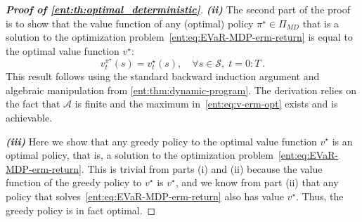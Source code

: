 \documentclass[twoside]{article}
\newcommand{\states}{\mathcal{S}}
\newcommand{\actions}{\mathcal{A}}
\newcommand{\opt}{^\star}
\newcommand{\erm}[2]{\operatorname{ERM}_{#1}\left[#2\right]}
\theoremstyle{plain}
\theoremstyle{definition}
\theoremstyle{remark}
\begin{document}
\begin{proof}[\bf\em Proof of \cref{ent:th:optimal_deterministic}]


{\bf\em (ii)} The second part of the proof is to show that the value function of any (optimal) policy $\pi\opt\in\Pi_{MD}$ that is a solution to the optimization problem~\eqref{ent:eq:EVaR-MDP-erm-return} is equal to the optimal value function $v\opt$:
\[
v_t^{\pi\opt}(s) = v_t\opt(s), \quad \forall s\in \states, \; t = 0{:}T~.
\]
This result follows using the standard backward induction argument and algebraic manipulation from \cref{ent:thm:dynamic-program}. The derivation relies on the fact that $\actions$ is finite and the maximum in~\eqref{ent:eq:v-erm-opt} exists and is achievable. 

{\bf\em (iii)} Here we show that any greedy policy to the optimal value function $v\opt$ is an optimal policy, that is, a solution to the optimization problem~\eqref{ent:eq:EVaR-MDP-erm-return}. This is trivial from parts (i) and (ii) because the value function of the greedy policy to $v^\star$ is $v^\star$, and we know from part (ii) that any policy that solves~\eqref{ent:eq:EVaR-MDP-erm-return} also has value $v^\star$. Thus, the greedy policy is in fact optimal. 
\end{proof}

\end{document}
